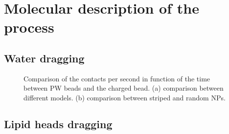 \chapter{Molecular description of the process}

\section{Water dragging}

\begin{figure}[]
	\center
	\caption{Comparison of the contacts per second in function of the time between \acs{PW} beads and the charged bead. (a) comparison between different models. (b) comparison between striped and random \acs{NP}s.}
\end{figure}


\section{Lipid heads dragging}

